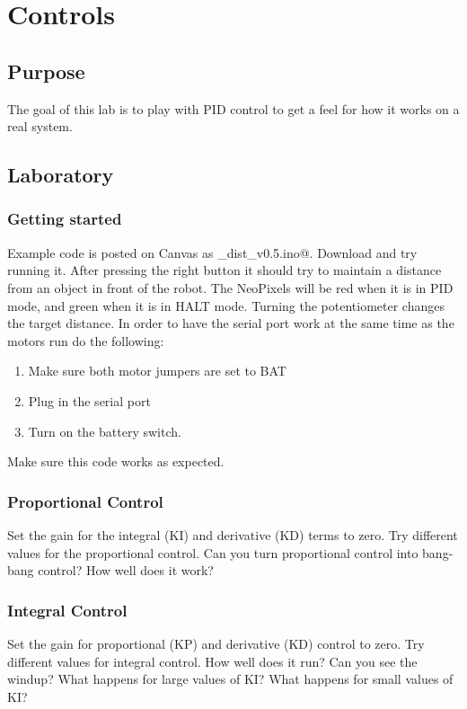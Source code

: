 \chapter{Controls}

\section{Purpose}
The goal of this lab is to play with PID control to get a feel for how it 
works on a real system.

\section{Laboratory}
\subsection{Getting started}
Example code is posted on Canvas as \lstinline@pid_dist_v0.5.ino@. Download and 
try running it. After pressing the right button it should try to maintain a 
distance from an object in front of the robot. The NeoPixels will be red when it 
is in PID mode, and green when it is in HALT mode. Turning the potentiometer
changes the target distance. In order to have the serial port work at the same 
time as the motors run do the following:
\begin{enumerate}
    \item Make sure both motor jumpers are set to BAT 
    \item Plug in the serial port 
    \item Turn on the battery switch.
\end{enumerate}

Make sure this code works as expected. 

\subsection{Proportional Control}
Set the gain for the integral (KI) and derivative (KD) terms to zero. 
Try different values for the proportional control. Can you turn proportional 
control into bang-bang control? How well does it work?

\subsection{Integral Control}
Set the gain for proportional (KP) and derivative (KD) control to zero. 
Try different values for integral control. How well does it run? Can you see 
the windup? What happens for large values of KI? What happens for small values of 
KI?

